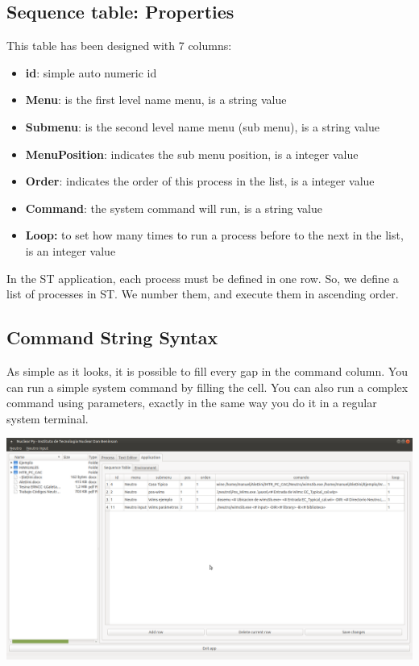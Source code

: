 \documentclass[a4paper,10pt]{article}
\begin{document}
\subsection{Sequence table: Properties}
This table has been designed with 7 columns:

\begin{itemize}
    \item \textbf{id}: simple auto numeric id
    \item \textbf{Menu}: is the first level name menu, is a string value
    \item \textbf{Submenu}: is the second level name menu (sub menu), is a string value
    \item \textbf{MenuPosition}: indicates the sub menu position, is a integer value
    \item \textbf{Order}: indicates the order of this process in the list, is a integer value
    \item \textbf{Command}: the system command will run, is a string value
    \item \textbf{Loop:} to set how many times to run a process before to the next in the list, is an integer value
\end{itemize}

In the ST application, each process must be defined in one row. So, we define a list of processes in ST. We number them, and execute them in ascending order.

\subsection{Command String Syntax}

As simple as it looks, it is possible to fill every gap in the command column. You can run a simple system command by filling the cell. You can also run a complex command using parameters, exactly in the same way you do it in a regular system terminal.

\begin{center}
 \includegraphics[width=\textwidth]{img/sequenceTable.png}
\end{center}
\end{document}
